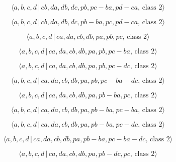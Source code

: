 \documentclass[10pt]{article}
\begin{document}
\begin{equation}
\langle a,b,c,d\,|\,cb,da,db,dc,pb,pc-ba,pd-ca,\,\text{class }2\rangle 
\tag{7.2992}
\end{equation}

\begin{equation}
\langle a,b,c,d\,|\,cb,da,db,dc,pb-ba,pc,pd-ca,\,\text{class }2\rangle 
\tag{7.2993}
\end{equation}

\begin{equation}
\langle a,b,c,d\,|\,ca,da,cb,db,pa,pb,pc,\,\text{class }2\rangle 
\tag{7.2994}
\end{equation}

\begin{equation}
\langle a,b,c,d\,|\,ca,da,cb,db,pa,pb,pc-ba,\,\text{class }2\rangle 
\tag{7.2995}
\end{equation}

\begin{equation}
\langle a,b,c,d\,|\,ca,da,cb,db,pa,pb,pc-dc,\,\text{class }2\rangle 
\tag{7.2996}
\end{equation}

\begin{equation}
\langle a,b,c,d\,|\,ca,da,cb,db,pa,pb,pc-ba-dc,\,\text{class }2\rangle 
\tag{7.2997}
\end{equation}

\begin{equation}
\langle a,b,c,d\,|\,ca,da,cb,db,pa,pb-ba,pc,\,\text{class }2\rangle 
\tag{7.2998}
\end{equation}

\begin{equation}
\langle a,b,c,d\,|\,ca,da,cb,db,pa,pb-ba,pc-ba,\,\text{class }2\rangle 
\tag{7.2999}
\end{equation}

\begin{equation}
\langle a,b,c,d\,|\,ca,da,cb,db,pa,pb-ba,pc-dc,\,\text{class }2\rangle 
\tag{7.3000}
\end{equation}

\begin{equation}
\langle a,b,c,d\,|\,ca,da,cb,db,pa,pb-ba,pc-ba-dc,\,\text{class }2\rangle 
\tag{7.3001}
\end{equation}

\begin{equation}
\langle a,b,c,d\,|\,ca,da,cb,db,pa,pb-dc,pc,\,\text{class }2\rangle 
\tag{7.3002}
\end{equation}
\end{document}
